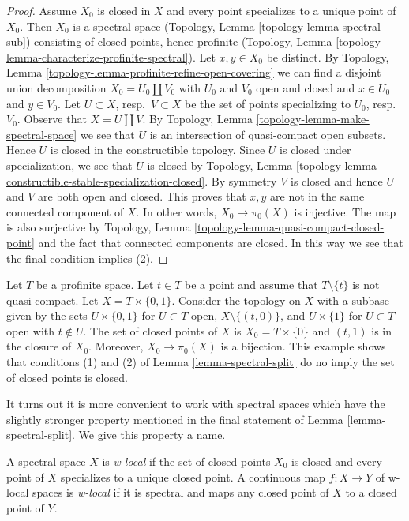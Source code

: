 \begin{proof}
\medskip\noindent
Assume $X_0$ is closed in $X$ and every point specializes to a unique
point of $X_0$. Then $X_0$ is a spectral space
(Topology, Lemma \ref{topology-lemma-spectral-sub})
consisting of closed points, hence profinite
(Topology, Lemma \ref{topology-lemma-characterize-profinite-spectral}).
Let $x, y \in X_0$ be distinct. By
Topology, Lemma \ref{topology-lemma-profinite-refine-open-covering}
we can find a disjoint union decomposition
$X_0 = U_0 \amalg V_0$ with $U_0$ and $V_0$ open and closed
and $x \in U_0$ and $y \in V_0$.
Let $U \subset X$, resp.\ $V \subset X$
be the set of points specializing to $U_0$, resp.\ $V_0$.
Observe that $X = U \amalg V$.
By Topology, Lemma \ref{topology-lemma-make-spectral-space}
we see that $U$ is an intersection of quasi-compact open subsets.
Hence $U$ is closed in the constructible topology.
Since $U$ is closed under specialization, we see that
$U$ is closed by Topology, Lemma
\ref{topology-lemma-constructible-stable-specialization-closed}.
By symmetry $V$ is closed and hence $U$ and $V$ are both
open and closed.
This proves that $x, y$ are not in the same connected component of $X$.
In other words, $X_0 \to \pi_0(X)$ is injective. The map is also
surjective by
Topology, Lemma \ref{topology-lemma-quasi-compact-closed-point}
and the fact that connected components are closed.
In this way we see that the final condition implies (2).
\end{proof}

\begin{example}
\label{example-not-w-local}
Let $T$ be a profinite space. Let $t \in T$ be a point and assume
that $T \setminus \{t\}$ is not quasi-compact.
Let $X = T \times \{0, 1\}$. Consider the topology on $X$
with a subbase given by the sets
$U \times \{0, 1\}$ for $U \subset T$ open, $X \setminus \{(t, 0)\}$,
and $U \times \{1\}$ for $U \subset T$ open with $t \not \in U$.
The set of closed points of $X$ is $X_0 = T \times \{0\}$ and
$(t, 1)$ is in the closure of $X_0$.
Moreover, $X_0 \to \pi_0(X)$ is a bijection.
This example shows that conditions (1) and (2) of
Lemma \ref{lemma-spectral-split} do no imply the set of closed points
is closed.
\end{example}

\noindent
It turns out it is more convenient to work with spectral
spaces which have the slightly stronger property mentioned in
the final statement of Lemma \ref{lemma-spectral-split}.
We give this property a name.

\begin{definition}
\label{definition-w-local}
A spectral space $X$ is {\it w-local} if the set of closed points $X_0$
is closed and every point of $X$ specializes to a unique closed point.
A continuous map $f : X \to Y$ of w-local spaces is {\it w-local}
if it is spectral and maps any closed point of $X$ to a closed point of $Y$.
\end{definition}

